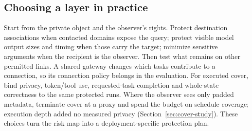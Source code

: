 \subsection{Choosing a layer in practice}
Start from the private object and the observer's rights. Protect destination associations when contacted domains expose the query; protect visible model output sizes and timing when those carry the target; minimize sensitive arguments when the recipient is the observer. Then test what remains on other permitted links. A shared gateway changes which tasks contribute to a connection, so its connection policy belongs in the evaluation. For executed cover, bind privacy, token/tool use, requested-task completion and whole-state correctness to the same protected runs. Where the observer sees only padded metadata, terminate cover at a proxy and spend the budget on schedule coverage; execution depth added no measured privacy (Section~\ref{sec:cover-study}). These choices turn the risk map into a deployment-specific protection plan.
